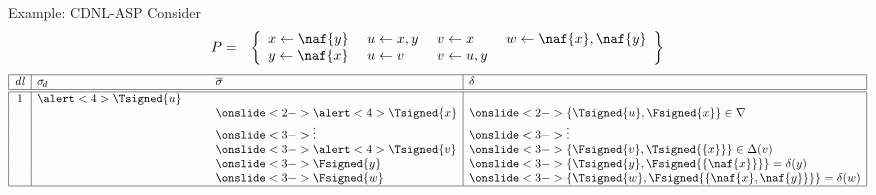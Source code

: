 \begin{frame}{Example: {CDNL-ASP}}
Consider
\begin{eqnarray*}
P
& = &
\left\{
  \begin{array}{l}
x  \leftarrow  \naf{y}\\%
y  \leftarrow  \naf{x}
\end{array}
\
\begin{array}{l}
u  \leftarrow x,y\\%
u  \leftarrow v%
\end{array}
\
\begin{array}{l}
v  \leftarrow x\\%
v  \leftarrow u,y%
\end{array}
\
\begin{array}{l}
w  \leftarrow \naf{x},\naf{y}\\
\mbox{~}
\end{array}
\right\}
\end{eqnarray*}
%
\[
\begin{array}[b]{|c|ll|l|}
\hline
\mathit{dl}& \sigma_{\!d} & \overline{\sigma} & \delta
\\\hline\hline
1 & \alert<4>{\Tsigned{u}} & \phantom{\Fsigned{\{x,y\}}}&\phantom{\{\Tsigned{u},\Fsigned{\{x\}},\Fsigned{\{x,y\}}\}=\lambda(u,\{u,v\})}
\\
  & \phantom{\Fsigned{\{\naf{x},\naf{y}\}}}& \onslide<2->{\alert<4>{\Tsigned{x}}} & \onslide<2->{\{\Tsigned{u},\Fsigned{x}\}\in\nabla}
\\
  & & \onslide<3->{\vdots} & \onslide<3->{\vdots}
\\
  & & \onslide<3->{\alert<4>{\Tsigned{v}}} & \onslide<3->{\{\Fsigned{v},\Tsigned{\{x\}}\}\in\ClNo{v}}
\\
  & & \onslide<3->{\Fsigned{y}} & \onslide<3->{\{\Tsigned{y},\Fsigned{\{\naf{x}\}}\}=\clno{y}}
\\
  & & \onslide<3->{\Fsigned{w}} & \onslide<3->{\{\Tsigned{w},\Fsigned{\{\naf{x},\naf{y}\}}\}=\clno{w}}
\\\hline
\end{array}
\]
\bigskip\bigskip\bigskip\bigskip\bigskip\bigskip
\end{frame}
